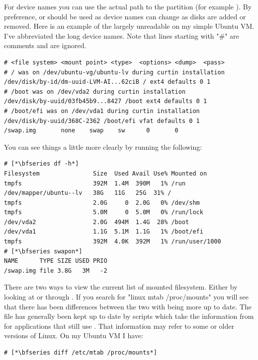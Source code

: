 \noindent
For device names you can use the actual path to the partition (for example ). By preference,   or  should be used as device names can change as disks are added or removed. Here is an example of the largely unreadable  on my simple Ubuntu VM. I've abbreviated the long device names. Note that lines starting with "\#" are comments and are ignored.

\begin{lstlisting}
# <file system> <mount point> <type>  <options> <dump>  <pass>
# / was on /dev/ubuntu-vg/ubuntu-lv during curtin installation
/dev/disk/by-id/dm-uuid-LVM-AI...62ciB / ext4 defaults 0 1
# /boot was on /dev/vda2 during curtin installation
/dev/disk/by-uuid/03fb45b9...8427 /boot ext4 defaults 0 1
# /boot/efi was on /dev/vda1 during curtin installation
/dev/disk/by-uuid/368C-2362 /boot/efi vfat defaults 0 1
/swap.img       none    swap    sw      0       0
\end{lstlisting}

\noindent
You can see things a little more clearly by running the following:

\begin{lstlisting}
# [*\bfseries df -h*]
Filesystem               Size  Used Avail Use% Mounted on
tmpfs                    392M  1.4M  390M   1% /run
/dev/mapper/ubuntu--lv   38G   11G   25G  31% /
tmpfs                    2.0G     0  2.0G   0% /dev/shm
tmpfs                    5.0M     0  5.0M   0% /run/lock
/dev/vda2                2.0G  494M  1.4G  28% /boot
/dev/vda1                1.1G  5.1M  1.1G   1% /boot/efi
tmpfs                    392M  4.0K  392M   1% /run/user/1000
# [*\bfseries swapon*]
NAME      TYPE SIZE USED PRIO
/swap.img file 3.8G   3M   -2
\end{lstlisting}

\noindent
There are two ways to view the current list of mounted filesystem. Either by looking at  or through . If you search for "linux mtab /proc/mounts" you will see that there has been differences between the two with  being more up to date. The  file has generally been kept up to date by scripts which take the information from  for applications that still use . That information may refer to some or older versions of Linux. On my Ubuntu VM I have:

\begin{lstlisting}
# [*\bfseries diff /etc/mtab /proc/mounts*]
\end{lstlisting}

